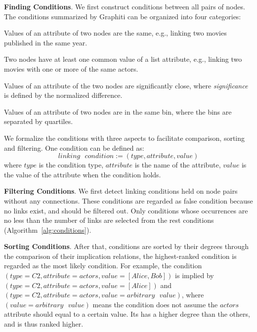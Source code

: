 \textbf{Finding Conditions}. We first construct conditions between all pairs of nodes. The conditions summarized by Graphiti can be organized into four categories:
\begin{compactenum}[\textbf{C}1]
    \item Values of an attribute of two nodes are the same, e.g., linking two movies published in the same year.
    \item Two nodes have at least one common value of a list attribute, e.g., linking two movies with one or more of the same actors.
    \item Values of an attribute of the two nodes are significantly close, where \textit{significance} is defined by the normalized difference.
    \item Values of an attribute of two nodes are in the same bin, where the bins are separated by quartiles.
\end{compactenum}

We formalize the conditions with three aspects to facilitate comparison, sorting and filtering.
One condition can be defined as:
\begin{equation}
    linking\text{ }condition := ( type, attribute, value )
\end{equation}
where $type$ is the condition type, $attribute$ is the name of the attribute, $value$ is the value of the attribute when the condition holds.

\textbf{Filtering Conditions}.
We first detect linking conditions held on node pairs without any connections.
These conditions are regarded as false condition because no links exist, and should be filtered out.
Only conditions whose occurrences are no less than the number of links are selected from the rest conditions (Algorithm~\ref{alg:conditions}).

\textbf{Sorting Conditions}.
After that, conditions are sorted by their degrees through the comparison of their implication relations, the highest-ranked condition is regarded as the most likely condition.
For example, the condition $(type=C2, attribute=actors, value=[Alice, Bob])$ is implied by $(type=C2, attribute=actors, value=[Alice])$ and $(type=C2, attribute=actors, value=arbitrary\text{ }value)$, where $(value=arbitrary\text{ }value)$ means the condition does not assume the $actors$ attribute should equal to a certain value.
Its has a higher degree than the others, and is thus ranked higher.

